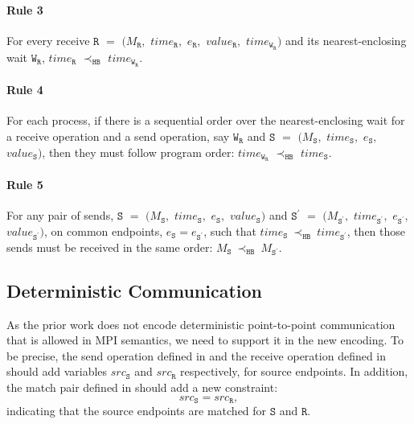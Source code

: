 \paragraph*{Rule 3} For every receive $\mathtt{R}$ $=$ $(M_\mathtt{R},$ $\mathit{time}_\mathtt{R},$ $e_\mathtt{R},$ $\mathit{value}_\mathtt{R},$ $\mathit{time}_{\mathtt{W}_\mathtt{R}})$ and its nearest-enclosing wait $\mathtt{W}_\mathtt{R}$, $\mathit{time}_\mathtt{R}$ $\prec_\mathtt{HB}$ $\mathit{time}_{\mathtt{W}_\mathtt{R}}$.

\paragraph*{Rule 4} For each process, if there is a sequential order over the nearest-enclosing wait for a receive operation and a send operation, say $\mathtt{W}_\mathtt{R}$ and $\mathtt{S}$ $=$ $(M_\mathtt{S},$ $\mathit{time}_\mathtt{S},$ $e_\mathtt{S},$ $\mathit{value}_\mathtt{S})$, then they must follow program order: $\mathit{time}_{\mathtt{W}_\mathtt{R}}$ $\prec_\mathtt{HB}$ $\mathit{time}_\mathtt{S}$.

\paragraph*{Rule 5} For any pair of sends, $\mathtt{S}$ $=$ $(M_\mathtt{S},$ $\mathit{time}_\mathtt{S},$ $e_\mathtt{S},$ $\mathit{value}_\mathtt{S})$ and
$\mathtt{S^\prime}$ $=$ $(M_\mathtt{S^\prime},$ $\mathit{time}_\mathtt{S^\prime},$ $e_\mathtt{S^\prime},$ $\mathit{value}_\mathtt{S^\prime})$, on common endpoints, $e_{\mathtt{S}}=e_{\mathtt{S^\prime}}$,
such that
$\mathit{time}_\mathtt{S}\ \mathrm{\prec_\mathtt{HB}}\ \mathit{time}_\mathtt{S^\prime}$,
then those sends must be received in the same order:
$M_{\mathtt{S}}\ \mathrm{\prec_{\mathtt{HB}}}\ M_{\mathtt{S^\prime}}$.

\subsection{Deterministic Communication}
As the prior work does not encode deterministic point-to-point communication that is allowed in MPI semantics, we need to support it in the new encoding. To be precise, the send operation defined in  and the receive operation defined in  should add variables $src_\mathtt{S}$ and $src_\mathtt{R}$ respectively, for source endpoints. In addition, the match pair defined in  should add a new constraint: 
\begin{equation*}
src_\mathtt{S} = src_\mathtt{R}, 
\end{equation*}
indicating that the source endpoints are matched for $\mathtt{S}$ and $\mathtt{R}$.

